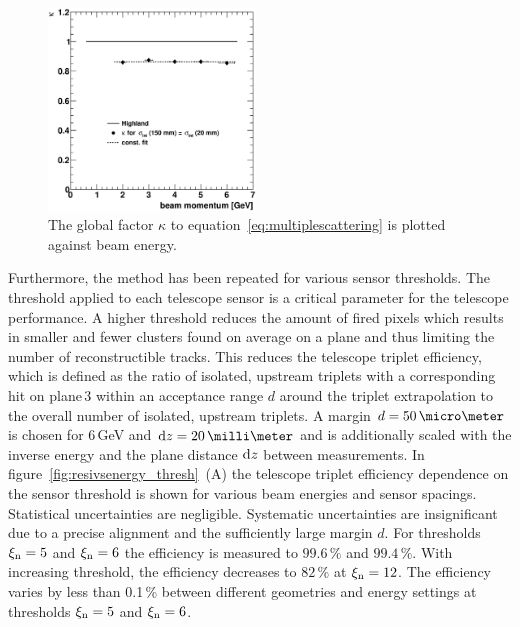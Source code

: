 \begin{figure}[ht!]
  \centering
  \includegraphics[width=0.49\textwidth]{figures/kappa}
  \caption[HL Factor]{
  The global factor $\kappa$ to equation~\ref{eq:multiplescattering} is plotted against beam energy.
  }
  \label{fig:HL_factor}
\end{figure}

Furthermore, the method has been repeated for various sensor thresholds.
The threshold applied to each telescope sensor is a critical parameter for the telescope performance.
A higher threshold reduces the amount of fired pixels which results in smaller and fewer clusters found on average on a plane and thus limiting the number of reconstructible tracks.
This reduces the telescope triplet efficiency, which is defined as the ratio of isolated, upstream triplets with a corresponding hit on plane\,3 within an acceptance range $d$
 around the triplet extrapolation to the overall number of isolated, upstream triplets.
A margin $d = 50\,\micro\meter$ is chosen for 6\,GeV and $\dz = 20\,\milli\meter$ and is additionally scaled with the inverse energy and the plane distance $\textrm{d}z$ between measurements. 
In figure~\ref{fig:resivsenergy_thresh}~(A) the telescope triplet efficiency dependence on the sensor threshold is shown for various beam energies and sensor spacings.
Statistical uncertainties are negligible.
Systematic uncertainties are insignificant due to a precise alignment and the sufficiently large margin $d$.  
For thresholds $\xi_{\textrm{n}} = 5$ and $\xi_{\textrm{n}} = 6$ the efficiency is measured to $99.6\,\%$ and $99.4\,\%$.
With increasing threshold, the efficiency decreases to $82\,\%$ at $\xi_{\textrm{n}} = 12$. 
The efficiency varies by less than 0.1\,\% between different geometries and energy settings at thresholds $\xi_{\textrm{n}} = 5$ and $\xi_{\textrm{n}} = 6$. 

